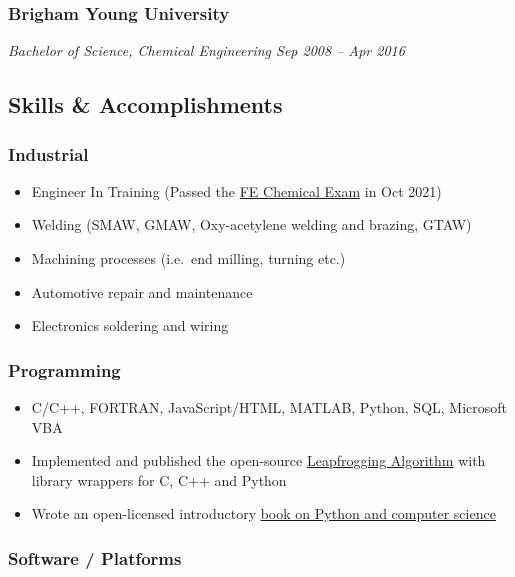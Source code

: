 \subsubsection{Brigham Young
University}\label{brigham-young-university-1}

\emph{Bachelor of Science, Chemical Engineering \textbar{} Sep 2008 --
Apr 2016}

\subsection{Skills \& Accomplishments}\label{skills-accomplishments}

\subsubsection{Industrial}\label{industrial}

\begin{itemize}
\tightlist
\item
  Engineer In Training (Passed the
  \href{https://account.ncees.org/rn/2233456-1459800-66313c5}{FE
  Chemical Exam} in Oct 2021)
\item
  Welding (SMAW, GMAW, Oxy-acetylene welding and brazing, GTAW)
\item
  Machining processes (i.e.~end milling, turning etc.)
\item
  Automotive repair and maintenance
\item
  Electronics soldering and wiring
\end{itemize}

\subsubsection{Programming}\label{programming}

\begin{itemize}
\tightlist
\item
  C/C++, FORTRAN, JavaScript/HTML, MATLAB, Python, SQL, Microsoft VBA
\item
  Implemented and published the open-source
  \href{https://github.com/flythereddflagg/lpfgopt}{Leapfrogging
  Algorithm} with library wrappers for C, C++ and Python
\item
  Wrote an open-licensed introductory
  \href{https://flythereddflagg.github.io/python_book/site/index.html}{book
  on Python and computer science}
\end{itemize}

\subsubsection{Software / Platforms}\label{software-platforms}

